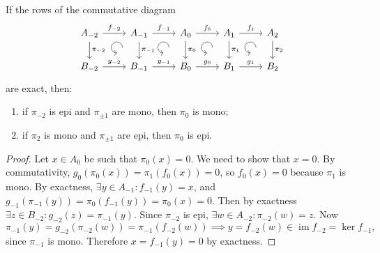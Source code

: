 \documentclass[english,letterpaper]{article}%
\numberwithin{equation}{section}
\numberwithin{figure}{section}
\numberwithin{table}{section}
\theoremstyle{definition}
\theoremstyle{definition}
\theoremstyle{definition}
\theoremstyle{plain}
\theoremstyle{plain}
\theoremstyle{plain}
\theoremstyle{plain}
\theoremstyle{remark}
\theoremstyle{remark}
\DeclareMathOperator{\im}{im}
\begin{document}
\begin{lem}[5-lemma]\label{5-lemma}
    If the rows of the commutative diagram
    \[\begin{tikzcd}[every matrix/.append style={name=m},   
        execute at end picture={\draw [<-] ([xshift=-8mm,yshift=-10mm]m-1-2.north) arc[start angle=-90,delta angle=-270,radius=0.2cm];
        \draw [<-] ([xshift=-8mm,yshift=-10mm]m-1-3.north) arc[start angle=-90,delta angle=-270,radius=0.2cm];
        \draw [<-] ([xshift=-8mm,yshift=-10mm]m-1-4.north) arc[start angle=-90,delta angle=-270,radius=0.2cm];
        \draw [<-] ([xshift=-8mm,yshift=-10mm]m-1-5.north) arc[start angle=-90,delta angle=-270,radius=0.2cm];}]
        A_{-2}\arrow[r,"f_{-2}"]\arrow[d,"\pi_{-2}"] & A_{-1}\arrow[r,"f_{-1}"]\arrow[d,"\pi_{-1}"] & A_0 \arrow[r,"f_0"]\arrow[d,"\pi_0"] & A_1\arrow[d,"\pi_1"]\arrow[r,"f_1"] & A_2\arrow[d,"\pi_2"] \\
       B_{-2}\arrow[r,"g_{-2}"] & B_{-1}\arrow[r,"g_{-1}"] & B_0\arrow[r,"g_0"] &B_1 \arrow[r,"g_1"] &B_2 
    \end{tikzcd}\]
    are exact, then:
    \begin{enumerate}
        \item if $\pi_{-2}$ is epi and $\pi_{\pm 1}$ are mono, then $\pi_0$ is mono;
        \item if $\pi_2$ is mono and $\pi_{\pm 1}$ are epi, then $\pi_0$ is epi.
    \end{enumerate}
\end{lem}
\begin{proof}
    Let $x\in A_0$ be such that $\pi_0(x)=0$. We need to show that $x=0$. By commutativity, $g_0(\pi_0(x))=\pi_1(f_0(x))=0$, so $f_0(x)=0$ because $\pi_1$ is mono. By exactness, $\exists y\in A_{-1}:f_{-1}(y)=x$, and $g_{-1}(\pi_{-1}(y))=\pi_0(f_{-1}(y))=\pi_0(x)=0$. Then by exactness $\exists z\in B_{-2}:g_{-2}(z)=\pi_{-1}(y)$. Since $\pi_{-2}$ is epi, $\exists w\in A_{-2}:\pi_{-2}(w)=z$. Now 
    \[\pi_{-1}(y)=g_{-2}(\pi_{-2}(w))=\pi_{-1}(f_{-2}(w))\implies y=f_{-2}(w)\in\im f_{-2}=\ker f_{-1},\]
    since $\pi_{-1}$ is mono. Therefore $x=f_{-1}(y)=0$ by exactness.
\end{proof}
\end{document}
